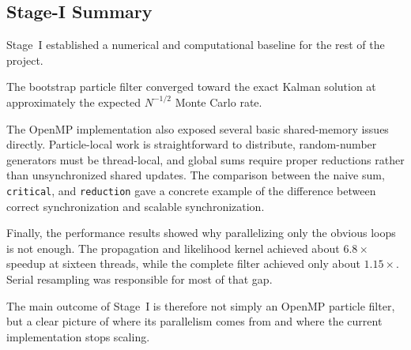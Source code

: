 \subsection{Stage-I Summary}
\label{subsec:stage1-conclusions}

Stage~I established a numerical and computational baseline for the rest
of the project.

The bootstrap particle filter converged toward the exact Kalman solution
at approximately the expected \(N^{-1/2}\) Monte Carlo rate.

The OpenMP implementation also exposed several basic shared-memory
issues directly. Particle-local work is straightforward to distribute,
random-number generators must be thread-local, and global sums require
proper reductions rather than unsynchronized shared updates. The
comparison between the naive sum, \texttt{critical}, and
\texttt{reduction} gave a concrete example of the difference between
correct synchronization and scalable synchronization.

Finally, the performance results showed why parallelizing only the
obvious loops is not enough. The propagation and likelihood kernel
achieved about \(6.8\times\) speedup at sixteen threads, while the
complete filter achieved only about \(1.15\times\). Serial resampling
was responsible for most of that gap.

The main outcome of Stage~I is therefore not simply an OpenMP particle
filter, but a clear picture of where its parallelism comes from and
where the current implementation stops scaling.